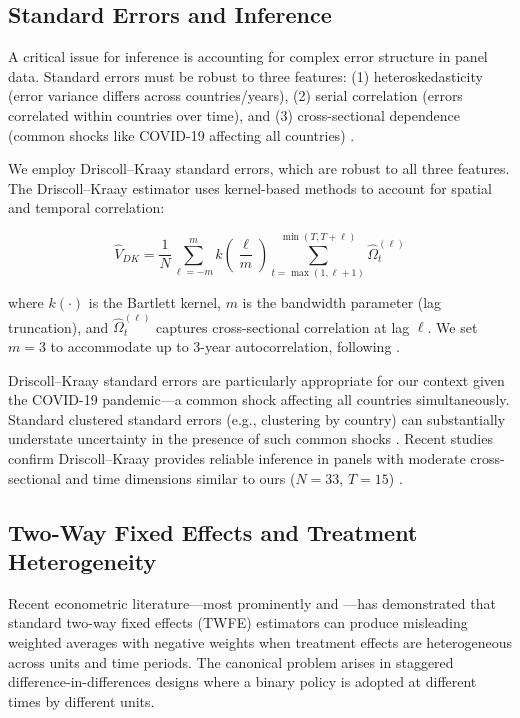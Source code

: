 \subsection{Standard Errors and Inference}

A critical issue for inference is accounting for complex error structure in panel data. Standard errors must be robust to three features: (1) heteroskedasticity (error variance differs across countries/years), (2) serial correlation (errors correlated within countries over time), and (3) cross-sectional dependence (common shocks like COVID-19 affecting all countries) \citep{cameron2015practitioner}.

We employ Driscoll--Kraay \citeyearpar{driscoll1998consistent} standard errors, which are robust to all three features. The Driscoll--Kraay estimator uses kernel-based methods to account for spatial and temporal correlation:

\begin{equation}
\hat{V}_{DK} = \frac{1}{N} \sum_{\ell=-m}^{m} k\left(\frac{\ell}{m}\right) \sum_{t=\max(1,\ell+1)}^{\min(T,T+\ell)} \hat{\Omega}_t^{(\ell)}
\end{equation}

where $k(\cdot)$ is the Bartlett kernel, $m$ is the bandwidth parameter (lag truncation), and $\hat{\Omega}_t^{(\ell)}$ captures cross-sectional correlation at lag $\ell$. We set $m=3$ to accommodate up to 3-year autocorrelation, following \citet{petersen2009estimating}.

Driscoll--Kraay standard errors are particularly appropriate for our context given the COVID-19 pandemic---a common shock affecting all countries simultaneously. Standard clustered standard errors (e.g., clustering by country) can substantially understate uncertainty in the presence of such common shocks \citep{cameron2015practitioner}. Recent studies confirm Driscoll--Kraay provides reliable inference in panels with moderate cross-sectional and time dimensions similar to ours ($N=33$, $T=15$) \citep{hoechle2007robust}.

\subsection{Two-Way Fixed Effects and Treatment Heterogeneity}

Recent econometric literature---most prominently \citet{goodman2021difference} and \citet{de2020two}---has demonstrated that standard two-way fixed effects (TWFE) estimators can produce misleading weighted averages with negative weights when treatment effects are heterogeneous across units and time periods. The canonical problem arises in staggered difference-in-differences designs where a binary policy is adopted at different times by different units.

